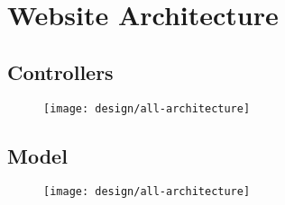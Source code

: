 \chapter{Website Architecture}

\section{Controllers}\label{app-arch:controller}
\begin{figure}[h]
	\centering
	\texttt{[image: design/all-architecture]}
\end{figure}

\newpage
\section{Model}\label{app-arch:model}

\begin{figure}[h]
	\centering
	\texttt{[image: design/all-architecture]}
\end{figure}
